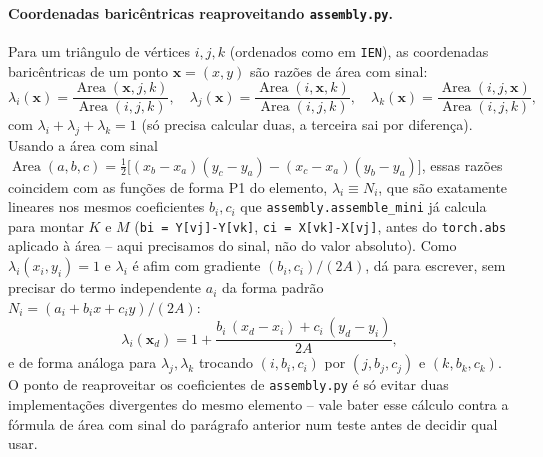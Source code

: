 \documentclass[11pt,a4paper]{article}
\begin{document}
\paragraph{Coordenadas baricêntricas reaproveitando \texttt{assembly.py}.}
Para um triângulo de vértices $i,j,k$ (ordenados como em
\texttt{IEN}), as coordenadas baricêntricas de um ponto
$\mathbf{x}=(x,y)$ são razões de área com sinal:
\[
\lambda_i(\mathbf{x}) = \frac{\operatorname{Area}(\mathbf{x}, j, k)}{\operatorname{Area}(i,j,k)}, \quad
\lambda_j(\mathbf{x}) = \frac{\operatorname{Area}(i, \mathbf{x}, k)}{\operatorname{Area}(i,j,k)}, \quad
\lambda_k(\mathbf{x}) = \frac{\operatorname{Area}(i, j, \mathbf{x})}{\operatorname{Area}(i,j,k)},
\]
com $\lambda_i+\lambda_j+\lambda_k=1$ (só precisa calcular duas, a
terceira sai por diferença). Usando a área com sinal
$\operatorname{Area}(a,b,c)=\tfrac12\big[(x_b-x_a)(y_c-y_a) -
(x_c-x_a)(y_b-y_a)\big]$, essas razões coincidem com as funções de
forma P1 do elemento, $\lambda_i \equiv N_i$, que são exatamente
lineares nos mesmos coeficientes $b_i, c_i$ que
\texttt{assembly.assemble\_mini} já calcula para montar $K$ e $M$
(\texttt{bi = Y[vj]-Y[vk]}, \texttt{ci = X[vk]-X[vj]}, antes do
\texttt{torch.abs} aplicado à área -- aqui precisamos do sinal, não
do valor absoluto). Como $\lambda_i(x_i,y_i)=1$ e $\lambda_i$ é afim
com gradiente $(b_i,c_i)/(2A)$, dá para escrever, sem precisar do
termo independente $a_i$ da forma padrão $N_i=(a_i+b_ix+c_iy)/(2A)$:
\[
\lambda_i(\mathbf{x}_d) = 1 + \frac{b_i\,(x_d - x_i) + c_i\,(y_d - y_i)}{2A},
\]
e de forma análoga para $\lambda_j, \lambda_k$ trocando $(i,b_i,c_i)$
por $(j,b_j,c_j)$ e $(k,b_k,c_k)$. O ponto de reaproveitar os
coeficientes de \texttt{assembly.py} é só evitar duas implementações
divergentes do mesmo elemento -- vale bater esse cálculo contra a
fórmula de área com sinal do parágrafo anterior num teste antes de
decidir qual usar.
\end{document}
